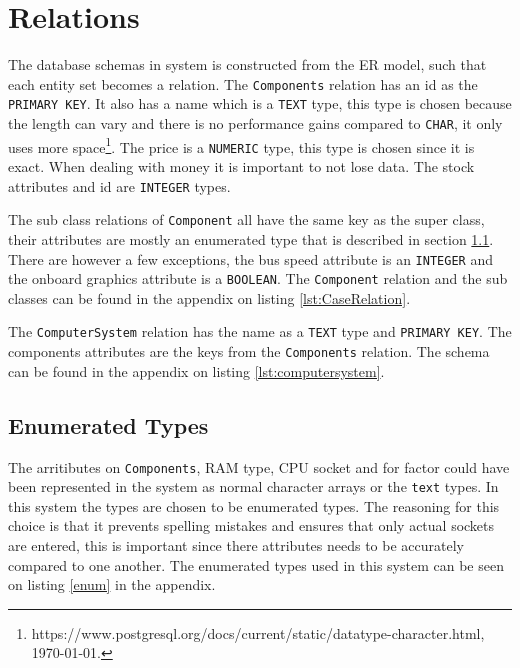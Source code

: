 \documentclass[12pt,a4paper]{article}
\begin{document}
%    

\section{Relations}
The database schemas in system is constructed from the ER model, such that each entity set becomes a relation.
The \texttt{Components} relation has an id as the \texttt{PRIMARY KEY}. 
It also has a name which is a \texttt{TEXT} type, this type is chosen because the length can vary and there is no performance gains compared to \texttt{CHAR}, it only uses more space\footnote{https://www.postgresql.org/docs/current/static/datatype-character.html, \today.}.
The price is a \texttt{NUMERIC} type, this type is chosen since it is exact. When dealing with money it is important to not lose data.
The stock attributes and id are \texttt{INTEGER} types.

The sub class relations of \texttt{Component} all have the same key as the super class, their attributes are mostly an enumerated type that is described in section \ref{sec:enum}. 
There are however a few exceptions, the bus speed attribute is an \texttt{INTEGER} and the onboard graphics attribute is a \texttt{BOOLEAN}. The \texttt{Component} relation and the sub classes can be found in the appendix on listing \ref{lst:CaseRelation}.

The \texttt{ComputerSystem} relation has the name as a \texttt{TEXT} type and \texttt{PRIMARY KEY}. The components attributes are the keys from the \texttt{Components} relation. The schema can be found in the appendix on listing \ref{lst:computersystem}. 

\subsection{Enumerated Types}
\label{sec:enum}
The arritibutes on \texttt{Components}, RAM type, CPU socket and for factor could have been represented in the system as normal character arrays or the \texttt{text} types. 
In this system the types are chosen to be enumerated types.
The reasoning for this choice is that it prevents spelling mistakes and ensures that only actual sockets are entered, this is important since there attributes needs to be accurately compared to one another.
The enumerated types used in this system can be seen on listing \ref{enum} in the appendix.
\end{document}
